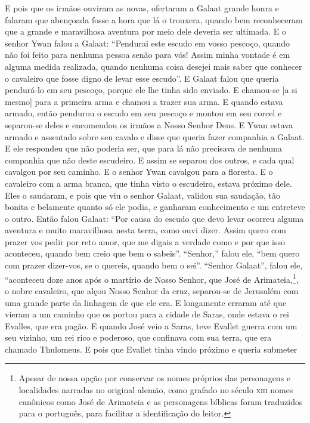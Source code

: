 E pois que os irmãos ouviram as novas, ofertaram a Galaat grande honra e falaram
que abençoada fosse a hora que lá o trouxera, quando bem reconheceram que a
grande e maravilhosa aventura por meio dele deveria ser ultimada. E o
senhor Ywan falou a Galaat: “Pendurai este escudo em vosso pescoço, quando não
foi feito para nenhuma pessoa senão para vós! Assim minha vontade é em alguma
medida realizada, quando nenhuma coisa desejei mais saber que conhecer o
cavaleiro que fosse digno de levar esse escudo”. E Galaat falou que queria
pendurá-lo em seu pescoço, porque ele lhe tinha sido enviado. E chamou-se [a si mesmo] para
a primeira arma e chamou a trazer sua arma. E quando estava armado, então
pendurou o escudo em seu pescoço e montou em seu corcel e separou-se deles e
encomendou os irmãos a Nosso Senhor Deus. E Ywan estava armado e assentado
sobre seu cavalo e disse que queria fazer companhia a Galaat. E ele respondeu
que não poderia ser, que para lá não precisava de nenhuma companhia que não
deste escudeiro. E assim se separou dos outros, e cada qual cavalgou por seu
caminho. E o senhor Ywan cavalgou para a floresta. E o cavaleiro com a arma
branca, que tinha visto o escudeiro, estava próximo dele. Eles o saudaram, e
pois que viu o senhor Galaat, validou sua saudação, tão bonita e belamente
quanto só ele podia, e ganharam conhecimento e um entreteve o outro. Então
falou Galaat: “Por causa do escudo que devo levar ocorreu alguma aventura e
muito maravilhosa nesta terra, como ouvi dizer. Assim quero com prazer vos
pedir por reto amor, que me digais a verdade como e por que isso aconteceu,
quando bem creio que bem o sabeis”. “Senhor,” falou ele, “bem quero com prazer
dizer-vos, se o quereis, quando bem o sei”. “Senhor Galaat”, falou ele,
“aconteceu doze anos após o martírio de Nosso Senhor, que José de
Arimateia,\footnote{ Apesar de nossa opção por conservar os nomes próprios das
personagens e localidades narradas no original alemão, como grafado no século
\textsc{xiii} nomes canônicos como José de Arimateia e as personagens bíblicas foram
traduzidos para o português, para facilitar a identificação do leitor.}, 
o nobre cavaleiro, que alçou Nosso Senhor da cruz, separou-se de
Jerusalém com uma grande parte da linhagem de que ele era. E longamente erraram
até que vieram a um caminho que os portou para a cidade de Saras, onde estava o
rei Evalles, que era pagão. E quando José veio a Saras, teve Evallet guerra com
um seu vizinho, um rei rico e poderoso, que confinava com sua terra, que era
chamado Thulomeus. E pois que Evallet tinha vindo próximo e queria submeter
